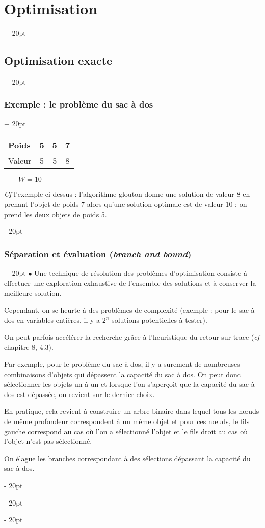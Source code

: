 \documentclass[a4paper, 12pt, twoside]{article}
\newcommand{\ind}[1][20pt]{\advance\leftskip + #1}
\newcommand{\deind}[1][20pt]{\advance\leftskip - #1}
\newenvironment{indt}[2][20pt]{#2 \par \ind[#1]}{\par \deind} %
\newcommand{\1}{\mathbbm 1}
\begin{document}
\begin{indt}{\section{Optimisation}}
\begin{indt}{\subsection{Optimisation exacte}}
\begin{indt}{\subsubsection{Exemple : le problème du sac à dos}}
                \begin{center}
                    \begin{tabular}{l|ccc}
                        Poids & 5 & 5 & 7
                        \\
                        \hline
                        Valeur & 5 & 5 & 8
                    \end{tabular}
                    $\qquad W = 10$
                \end{center}

                \textit{Cf} l'exemple ci-dessus : l'algorithme glouton donne une solution de valeur $8$ en prenant l'objet de poids 7 alors qu'une solution optimale est de valeur 10 : on prend les deux objets de poids 5.
            \end{indt}

            \vspace{12pt}
            
            \begin{indt}{\subsubsection{Séparation et évaluation (\textit{branch and bound})}}
                $\bullet$ Une technique de résolution des problèmes d'optimisation consiste à effectuer une exploration exhaustive de l'ensemble des solutions et à conserver la meilleure solution.

                Cependant, on se heurte à des problèmes de complexité (exemple : pour le sac à dos en variables entières, il y a $2^n$ solutions potentielles à tester).

                On peut parfois accélérer la recherche grâce à l'heuristique du retour sur trace (\textit{cf} chapitre 8, 4.3).

                Par exemple, pour le problème du sac à dos, il y a surement de nombreuses combinaisons d'objets qui dépassent la capacité du sac à dos. On peut donc sélectionner les objets un à un et lorsque l'on s'aperçoit que la capacité du sac à dos est dépassée, on revient sur le dernier choix.

                En pratique, cela revient à construire un arbre binaire dans lequel tous les n\oe uds de même profondeur correspondent à un même objet et pour ces n\oe uds, le fils gauche correspond au cas où l'on a sélectionné l'objet et le fils droit au cas où l'objet n'est pas sélectionné.

                On élague les branches correspondant à des sélections dépassant la capacité du sac à dos.


\end{indt}
\end{indt}
\end{indt}
\end{document}
